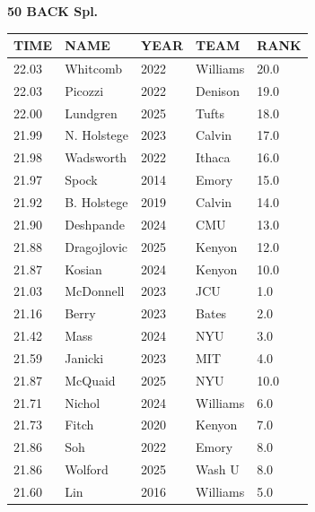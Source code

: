 \begin{table}[H]
\centering
\begin{minipage}[t]{0.6\textwidth}
\centering
\textbf{50 BACK Spl.}\\[0.1cm]
\begin{tabular}{@{}p{1.8cm}p{2.8cm}p{1.2cm}p{1.4cm}p{0.8cm}@{}}
\hline
    \textbf{TIME} & \textbf{NAME} & \textbf{YEAR} & \textbf{TEAM} & \textbf{RANK} \\
\hline
    22.03 & Whitcomb & 2022 & Williams & 20.0 \\
    22.03 & Picozzi & 2022 & Denison & 19.0 \\
    22.00 & Lundgren & 2025 & Tufts & 18.0 \\
    21.99 & N. Holstege & 2023 & Calvin & 17.0 \\
    21.98 & Wadsworth & 2022 & Ithaca & 16.0 \\
    21.97 & Spock & 2014 & Emory & 15.0 \\
    21.92 & B. Holstege & 2019 & Calvin & 14.0 \\
    21.90 & Deshpande & 2024 & CMU & 13.0 \\
    21.88 & Dragojlovic & 2025 & Kenyon & 12.0 \\
    21.87 & Kosian & 2024 & Kenyon & 10.0 \\
    21.03 & McDonnell & 2023 & JCU & 1.0 \\
    21.16 & Berry & 2023 & Bates & 2.0 \\
    21.42 & Mass & 2024 & NYU & 3.0 \\
    21.59 & Janicki & 2023 & MIT & 4.0 \\
    21.87 & McQuaid & 2025 & NYU & 10.0 \\
    21.71 & Nichol & 2024 & Williams & 6.0 \\
    21.73 & Fitch & 2020 & Kenyon & 7.0 \\
    21.86 & Soh & 2022 & Emory & 8.0 \\
    21.86 & Wolford & 2025 & Wash U & 8.0 \\
    21.60 & Lin & 2016 & Williams & 5.0 \\
\hline
\end{tabular}
\end{minipage}
\end{table}

